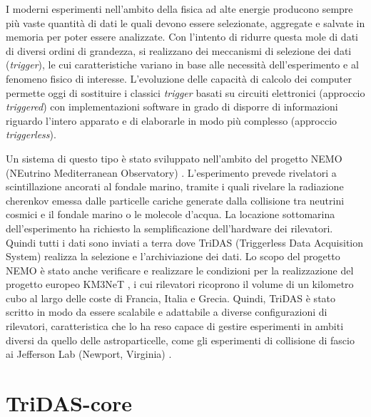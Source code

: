 \documentclass[../main.tex]{subfiles}
\begin{document}

I moderni esperimenti nell'ambito della fisica ad alte energie producono sempre più vaste quantità di dati le quali devono essere selezionate, aggregate e salvate in memoria per poter essere analizzate.  
Con l'intento di ridurre questa mole di dati di diversi ordini di grandezza, si realizzano dei meccanismi di selezione dei dati (\emph{trigger}), le cui caratteristiche variano in base alle necessità dell'esperimento e al fenomeno fisico di interesse.
L'evoluzione delle capacità di calcolo dei computer permette oggi di sostituire i classici \emph{trigger} basati su circuiti elettronici (approccio \emph{triggered}) con implementazioni software in grado di disporre di informazioni riguardo l'intero apparato e di elaborarle in modo più complesso (approccio \emph{triggerless}).  

Un sistema di questo tipo è stato sviluppato nell'ambito del progetto \mbox{NEMO} (NEutrino Mediterranean Observatory) \cite{CHIARUSI2013129}. L'esperimento prevede rivelatori a scintillazione ancorati al fondale marino, tramite i quali rivelare la radiazione cherenkov emessa dalle particelle cariche generate dalla collisione tra neutrini cosmici e il fondale marino o le molecole d'acqua. La locazione sottomarina dell'esperimento ha richiesto la semplificazione dell'hardware dei rilevatori. Quindi tutti i dati sono inviati a terra dove TriDAS (Triggerless Data Acquisition System) realizza la selezione e l'archiviazione dei dati.
Lo scopo del progetto NEMO è stato anche verificare e realizzare le condizioni per la realizzazione del progetto europeo KM3NeT \cite{km3}, i cui rilevatori ricoprono il volume di un kilometro cubo al largo delle coste di Francia, Italia e Grecia. 
Quindi, TriDAS è stato scritto in modo da essere scalabile e adattabile a diverse configurazioni di rilevatori, caratteristica che lo ha reso capace di gestire esperimenti in ambiti diversi da quello delle astroparticelle, come gli esperimenti di collisione di fascio ai Jefferson Lab (Newport, Virginia) \cite{3x3telescope}. 

\section{TriDAS-core}
\end{document}
